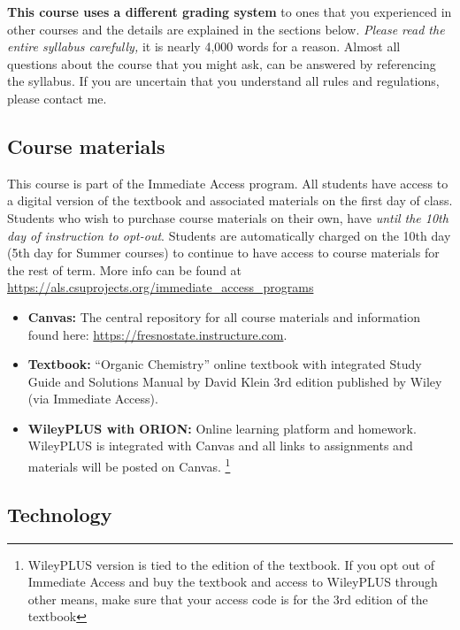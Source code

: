 \textbf{This course uses a different grading system} to ones that you
experienced in other courses and the details are explained in the
sections below. \emph{Please read the entire syllabus carefully,} it is
nearly 4,000 words for a reason. Almost all questions about the course
that you might ask, can be answered by referencing the syllabus. If you
are uncertain that you understand all rules and regulations, please
contact me.

\hypertarget{course-materials}{%
\subsection{Course materials}\label{course-materials}}

This course is part of the Immediate Access program. All students have
access to a digital version of the textbook and associated materials on
the first day of class. Students who wish to purchase course materials
on their own, have \emph{until the 10th day of instruction to opt-out}.
Students are automatically charged on the 10th day (5th day for Summer
courses) to continue to have access to course materials for the rest of
term. More info can be found at
\url{https://als.csuprojects.org/immediate_access_programs}

\begin{itemize}
\tightlist
\item
  \textbf{Canvas:} The central repository for all course materials and
  information found here: \url{https://fresnostate.instructure.com}.
\item
  \textbf{Textbook:} ``Organic Chemistry'' online textbook with
  integrated Study Guide and Solutions Manual by David Klein 3rd edition
  published by Wiley (via Immediate Access).
\item
  \textbf{WileyPLUS with ORION:} Online learning platform and homework.
  WileyPLUS is integrated with Canvas and all links to assignments and
  materials will be posted on Canvas. \footnote{WileyPLUS version is
    tied to the edition of the textbook. If you opt out of Immediate
    Access and buy the textbook and access to WileyPLUS through other
    means, make sure that your access code is for the 3rd edition of the
    textbook}
\end{itemize}

\hypertarget{technology}{%
\subsection{Technology}\label{technology}}

